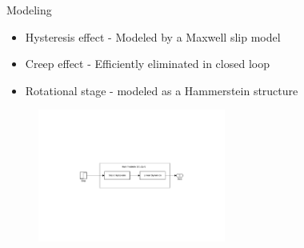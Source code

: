 \documentclass[10pt]{beamer}
\begin{document}
\begin{frame}{Modeling}
  \begin{itemize}
    \item \alert{Hysteresis effect} - Modeled by a Maxwell slip model
    \item \alert{Creep effect} - Efficiently eliminated in closed loop
    \item \alert{Rotational stage} - modeled as a Hammerstein structure
  \end{itemize}

  \begin{figure}[h]
    \centering %
    \includegraphics[width=0.55\textwidth, trim=8cm 8cm 7.73cm 8cm, clip=true]{../fig/matlab/hammerstein}
  \end{figure}
  \vspace{-1cm}

  \begin{figure}[h]
    \centering %
    \qquad
    \qquad
  \end{figure}
\end{frame}
\end{document}
